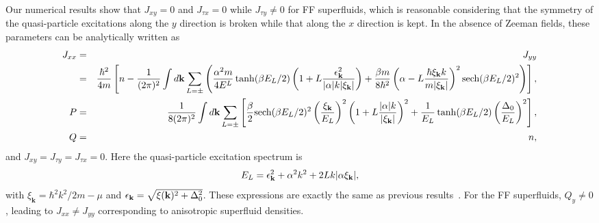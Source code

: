 \documentclass[prl,aps,twocolumn,showpacs, floatfix]{revtex4}
\begin{document}
\begin{widetext}
Our numerical results show that $J_{xy}=0$ and $J_{\tau x}=0$ while $J_{\tau
y}\neq 0$ for FF superfluids, which is reasonable considering that the
symmetry of the quasi-particle excitations along the $y$ direction is broken
while that along the $x$ direction is kept. In the absence of Zeeman fields,
these parameters can be analytically written as
\begin{eqnarray}
J_{xx} &=&J_{yy} \\
&=&\frac{\hbar ^{2}}{4m}\left[ n-\frac{1}{(2\pi)^2}\int d{\bf k}\sum_{L=\pm
}\left( \frac{\alpha ^{2}m}{4E^{L}}\tanh (\beta E_{L}/2)\left( 1+L\frac{%
\epsilon _{\mathbf{k}}^{2}}{|\alpha |k|\xi _{\mathbf{k}}|}\right) +\frac{%
\beta m}{8\hbar ^{2}}\left( \alpha -L\frac{\hbar \xi _{\mathbf{k}}k}{m|\xi _{%
\mathbf{k}}|}\right) ^{2}\text{sech}(\beta E_{L}/2)^{2}\right) \right] ,
\notag \\
P &=&\frac{1}{8(2\pi)^2}\int d{\bf k}\sum_{L=\pm }\left[ \frac{\beta
}{2}\text{sech}(\beta E_{L}/2)^{2}\left( \frac{\xi _{\mathbf{k}}}{E_{L}}%
\right) ^{2}\left( 1+L\frac{|\alpha |k}{|\xi _{\mathbf{k}}|}\right) ^{2}+%
\frac{1}{E_{L}}\tanh (\beta E_{L}/2)\left( \frac{\Delta_0 }{E_{L}}\right) ^{2}%
\right] , \\
Q &=&n,
\end{eqnarray}%
and $J_{xy}=J_{\tau y}=J_{\tau x}=0$. Here the quasi-particle excitation
spectrum is
\begin{equation}
E_{L}=\epsilon_{\bf k}^2+\alpha ^{2}k^{2}+2Lk|\alpha \xi _{%
\mathbf{k}}|,
\end{equation}%
with $\xi _{\mathbf{k}}=\hbar ^{2}k^{2}/2m-\mu $ and
$\epsilon_{\bf k}=\sqrt{\xi({\bf k})^2+\Delta_0^2}$. These expressions are
exactly the same as previous results~\cite{MingGongPRLS}. For the FF
superfluids, $Q_{y}\neq 0$, leading to $J_{xx}\neq J_{yy}$ corresponding to
anisotropic superfluid densities.


\end{widetext}
\end{document}
